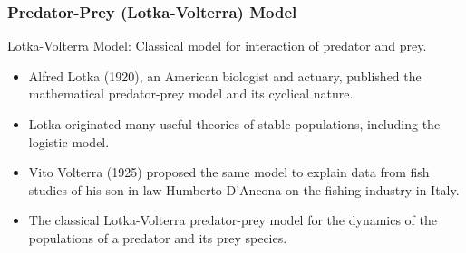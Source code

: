 \begin{frame}
    \frametitle{Predator-Prey (Lotka-Volterra) Model}
Lotka-Volterra Model: Classical model for interaction of predator
and prey.    
    \begin{itemize}
    \item 
     Alfred Lotka (1920), an American biologist and actuary,
published the mathematical predator-prey model and its
cyclical nature.
        \item  Lotka originated many useful theories of stable populations,
including the logistic model.
        \item Vito Volterra (1925) proposed the same model to explain data
from fish studies of his son-in-law Humberto D'Ancona on the
fishing industry in Italy.
        \item The classical Lotka-Volterra predator-prey model for the
dynamics of the populations of a predator and its prey species.

    \end{itemize} 
\end{frame}

